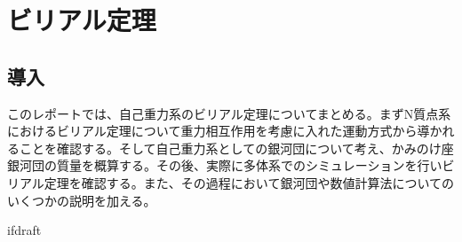 \documentclass{jsarticle}
\begin{document}
\fi
\section  {ビリアル定理}
\subsection {導入}
このレポートでは、自己重力系のビリアル定理についてまとめる。まずN質点系におけるビリアル定理について重力相互作用を考慮に入れた運動方式から導かれることを確認する。そして自己重力系としての銀河団について考え、かみのけ座銀河団の質量を概算する。その後、実際に多体系でのシミュレーションを行いビリアル定理を確認する。また、その過程において銀河団や数値計算法についてのいくつかの説明を加える。
\newpage


\expandafter\ifx\csname ifdraft\endcsname\relax
  
\end{document}
